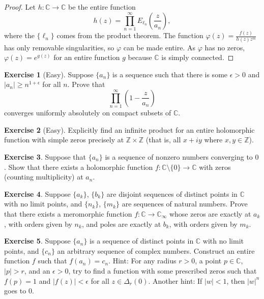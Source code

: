 \documentclass[12pt,openany]{book}
\newcommand{\sabs}[1]{\lvert {#1} \rvert}
\newcommand{\C}{{\mathbb{C}}}
\newcommand{\Z}{{\mathbb{Z}}}
\theoremstyle{plain}
\theoremstyle{remark}
\theoremstyle{definition}
\newenvironment{exbox}{%
    \def\FrameCommand{\vrule width 1pt \relax\hspace{10pt}}%
    \MakeFramed{\advance\hsize-\width\FrameRestore}%
}{%
    \endMakeFramed
}
\theoremstyle{exercise}
\newtheorem{exercise}{Exercise}[section]
\theoremstyle{example}
\begin{document}
\begin{proof}
Let $h \colon \C \to \C$ be the entire function
\begin{equation*}
h(z) = \prod_{n=1}^\infty E_{\ell_n}\left(\frac{z}{a_n}\right) ,
\end{equation*}
where the $\{ \ell_n \}$ comes from the product theorem.  The function
$\varphi(z) = \frac{f(z)}{h(z)z^m}$
has only removable singularities, so $\varphi$ can be made entire.
As $\varphi$ has no zeros, $\varphi(z) =
e^{g(z)}$ for an entire function $g$ because $\C$ is simply connected.
\end{proof}

\begin{exbox}
\begin{exercise}[Easy]
Suppose $\{ a_n \}$ is a sequence such that there is some $\epsilon>0$ and
$\sabs{a_n} \geq n^{1+\epsilon}$ for all $n$.  Prove that
\begin{equation*}
\prod_{n=1}^\infty
\left(1-\frac{z}{a_n} \right)
\end{equation*}
converges uniformly absolutely on compact subsets of $\C$.
\end{exercise}

\begin{exercise}[Easy]
Explicitly find an infinite product for an entire holomorphic function
with simple zeros precisely at $\Z \times \Z$ (that is,
all $x + iy$ where $x,y \in \Z$).
\end{exercise}

\begin{exercise}
Suppose that $\{ a_n \}$ is a sequence of
nonzero numbers converging to $0$.
Show that there
exists a holomorphic function $f \colon \C \setminus \{ 0 \} \to \C$
with zeros (counting multiplicity) at $a_n$.
\end{exercise}

\begin{exercise}
Suppose $\{ a_k \}$, $\{ b_k \}$ are
disjoint sequences of distinct points in $\C$
with no limit points, and $\{ n_k \}$, $\{ m_k \}$ are sequences of
natural numbers.
Prove that
there exists a meromorphic function $f \colon \C \to \C_\infty$ whose
zeros are exactly at $a_k$, with orders given by $n_k$, and
poles are exactly at $b_k$, with orders given by $m_k$.
\end{exercise}

\begin{exercise}
Suppose $\{ a_n \}$ is a sequence of distinct points in $\C$
with no limit points, and $\{ c_n \}$ an arbitrary sequence of complex
numbers.  Construct an entire function $f$ such that $f(a_n) = c_n$.
Hint:  For any radius $r > 0$, a point $p \in \C$, $\sabs{p} > r$, and
an $\epsilon > 0$, try to find a function with some prescribed zeros
such that $f(p) =1$ and $\sabs{f(z)} < \epsilon$ for all $z \in \Delta_r(0)$.
Another hint:
If $\sabs{w} < 1$, then $\sabs{w}^n$ goes to $0$.
\end{exercise}
\end{exbox}
\end{document}
